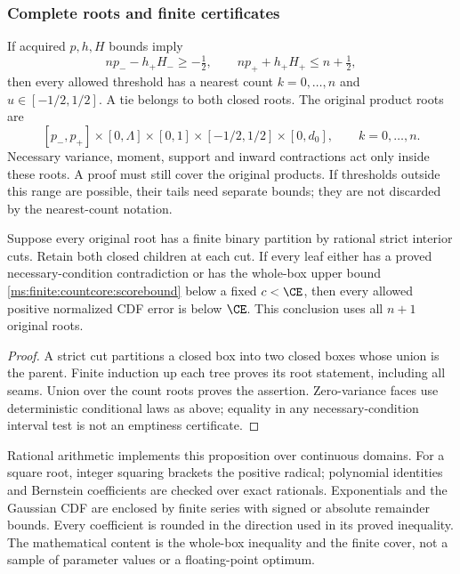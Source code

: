 \subsubsection{Complete roots and finite certificates}

If acquired \(p,h,H\) bounds imply
\[
 np_- -h_+H_-\ge-\tfrac12,\qquad
 np_+ +h_+H_+\le n+\tfrac12,
\]
then every allowed threshold has a nearest count \(k=0,\ldots,n\)
and \(u\in[-1/2,1/2]\). A tie belongs to both closed roots.
The original product roots are
\[
 [p_-,p_+]\times[0,\Lambda]\times[0,1]
                  \times[-1/2,1/2]\times[0,d_0],
 \qquad k=0,\ldots,n.
\]
Necessary variance, moment, support and inward contractions act only
inside these roots. A proof must still cover the original products.
If thresholds outside this range are possible, their tails need separate
bounds; they are not discarded by the nearest-count notation.

\begin{proposition}
\label{ms:finite:countcore:forest}
Suppose every original root has a finite binary partition by rational
strict interior cuts. Retain both closed children at each cut. If every
leaf either has a proved necessary-condition contradiction or has the
whole-box upper bound \eqref{ms:finite:countcore:scorebound} below a fixed
\(c<\CE\), then every allowed positive normalized CDF error is below
\(\CE\). This conclusion uses all \(n+1\) original roots.
\end{proposition}
\begin{proof}
A strict cut partitions a closed box into two closed boxes whose union
is the parent. Finite induction up each tree proves its root statement,
including all seams. Union over the count roots proves the assertion.
Zero-variance faces use deterministic conditional laws as above; equality
in any necessary-condition interval test is not an emptiness certificate.
\end{proof}

Rational arithmetic implements this proposition over continuous domains.
For a square root, integer squaring brackets the positive radical;
polynomial identities and Bernstein coefficients are checked over exact
rationals. Exponentials and the Gaussian CDF are enclosed by finite series
with signed or absolute remainder bounds. Every coefficient is rounded in
the direction used in its proved inequality. The mathematical content is
the whole-box inequality and the finite cover, not a sample of parameter
values or a floating-point optimum.

